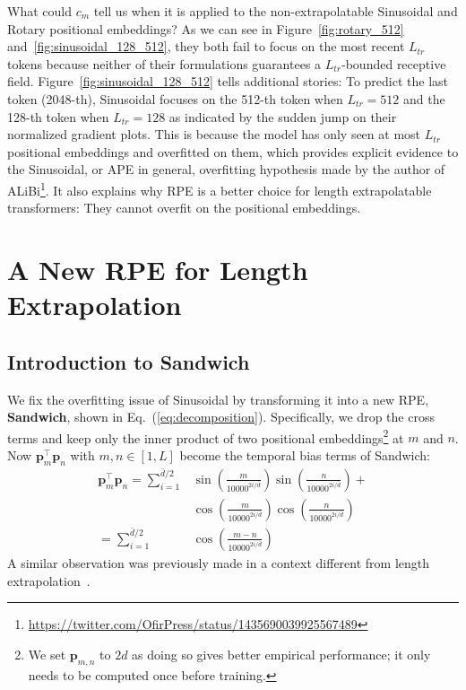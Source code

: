 \documentclass[11pt]{article}
\theoremstyle{plain}
\begin{document}
What could $c_m$ tell us when it is applied to the non-extrapolatable Sinusoidal and Rotary positional embeddings?  As we can see in Figure~\ref{fig:rotary_512} and~\ref{fig:sinusoidal_128_512}, they both fail to focus on the most recent $L_{tr}$ tokens because neither of their formulations guarantees a $L_{tr}$-bounded receptive field. Figure~\ref{fig:sinusoidal_128_512} tells additional stories: To predict the last token (2048-th), Sinusoidal focuses on the 512-th token when $L_{tr}=512$ and the 128-th token when $L_{tr}=128$ as indicated by the sudden jump on their normalized gradient plots. This is because the model has only seen at most $L_{tr}$ positional embeddings and overfitted on them, which provides explicit evidence to the Sinusoidal, or APE in general, overfitting hypothesis made by the author of ALiBi\footnote{\url{https://twitter.com/OfirPress/status/1435690039925567489}}. 
It also explains why RPE is a better choice for length extrapolatable transformers: They cannot overfit on the positional embeddings.

\section{A New RPE for Length Extrapolation}
\subsection{Introduction to Sandwich}
\label{sec:intro_sandwich}
We fix the overfitting issue of Sinusoidal by transforming it into a new RPE, \textbf{Sandwich}, shown in Eq.~(\ref{eq:decomposition}). Specifically, we drop the cross terms and keep only the inner product of two positional embeddings\footnote{We set $\bm p_{m,n}$ to $2d$ as doing so gives better empirical performance; it only needs to be computed once before training.} at $m$ and $n$. Now $\bm p_m^\top \bm p_n$ with $m,n\in[1,L]$ become the temporal bias terms of Sandwich:
\begin{align*}
    \bm p_m^\top \bm p_n = \sum_{i=1}^{\bar d/2} &\sin\left(\frac{m}{10000^{2i/\bar d}}\right) \sin\left(\frac{n}{10000^{2i/\bar d}}\right) + \nonumber \\ &\cos\left(\frac{m}{10000^{2i/\bar d}}\right) \cos\left(\frac{n}{10000^{2i/\bar d}}\right) \nonumber\\
    =\sum_{i=1}^{\bar d/2}&\cos\left(\frac{m-n}{10000^{2i/\bar d}}\right)
\end{align*}
A similar observation was previously made in a context different from length extrapolation~\cite{yan2019tener}.
\end{document}
